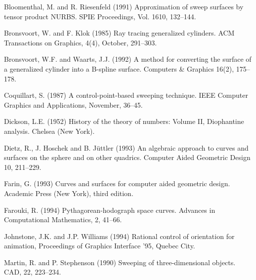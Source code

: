

\ifFull
\begin{thebibliography}{Shoemake 85}

Bloomenthal, M. and R. Riesenfeld (1991)
Approximation of sweep surfaces by tensor product NURBS.
SPIE Proceedings,
Vol. 1610, 132--144.

Bronsvoort, W. and F. Klok (1985)
Ray tracing generalized cylinders.
ACM Transactions on Graphics, 4(4), October, 291--303.

Bronsvoort, W.F. and Waarts, J.J. (1992)
A method for converting the surface of a generalized cylinder into
a B-spline surface.
Computers \& Graphics 16(2), 175--178.

Coquillart, S. (1987)
A control-point-based sweeping technique.
IEEE Computer Graphics and Applications, November, 36--45.

Dickson, L.E. (1952) History of the theory of numbers: Volume II,
Diophantine analysis.  Chelsea (New York).

Dietz, R., J. Hoschek and B. J\"{u}ttler (1993)
An algebraic approach to curves and surfaces on the sphere and on other
quadrics.  Computer Aided Geometric Design 10, 211--229.

Farin, G. (1993) Curves and surfaces for computer aided geometric design.
Academic Press (New York), third edition.

Farouki, R. (1994)
Pythagorean-hodograph space curves.
Advances in Computational Mathematics, 2, 41--66.



Johnstone, J.K. and J.P. Williams (1994) Rational control of orientation
for animation, Proceedings of Graphics Interface '95, Quebec City.

Martin, R. and P. Stephenson (1990)
Sweeping of three-dimensional objects.
CAD, 22, 223--234.


\end{thebibliography}
